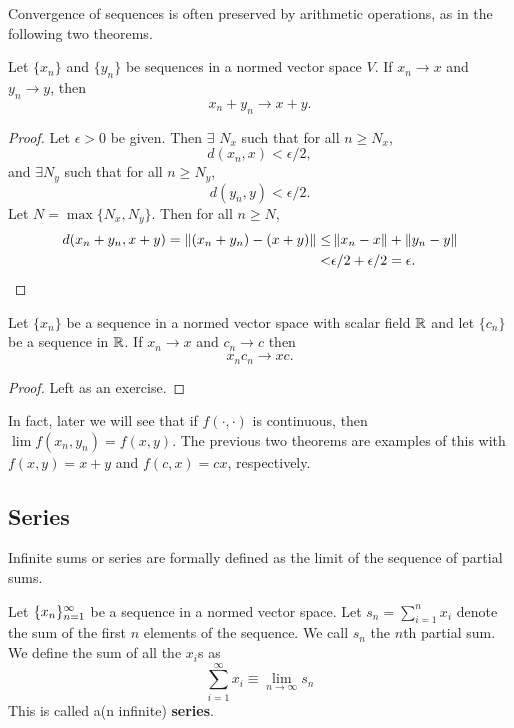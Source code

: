 Convergence of sequences is often preserved by arithmetic
operations, as in the following two theorems.
\begin{theorem}
  Let $\{x_n\}$ and $\{y_n\}$ be sequences in a normed vector space
  $V$. If $x_n \to x$ and $y_n \to y$, then
  \[ x_n + y_n \to x + y. \]
\end{theorem}
\begin{proof}
  Let $\epsilon > 0$ be given. Then $\exists$ $N_x$ such that for all
  $n \geq N_x$, 
  \[ d(x_n,x) < \epsilon/2,\] and $\exists N_y$ such that
  for all $n \geq N_y$,  
  \[ d(y_n,y) < \epsilon/2. \]
  Let $N =\max\{N_x,N_y\}$. Then for all $n \geq N$, 
  \begin{align*}
    d(x_n + y_n,x+y) = \left\Vert {(x_n + y_n) - (x+y)} \right\Vert \leq & \left\Vert {x_n -
      x} \right\Vert + \left\Vert {y_n - y} \right\Vert \\
    < & \epsilon/2 + \epsilon /2  = \epsilon.
  \end{align*}  
\end{proof}
\begin{theorem}
  Let $\{x_n \}$ be a sequence in a normed vector space with scalar
  field $\mathbb{R}$ and let $\{c_n\}$ be a sequence in $\mathbb{R}$. If
  $x_n \to x$ and $c_n \to c$ then 
  \[ x_n c_n \to x c. \]
\end{theorem}
\begin{proof}
  Left as an exercise.
\end{proof}
In fact, later we will see that if $f(\cdot,\cdot)$ is
continuous, then $\lim f(x_n, y_n) = f(x,y)$. The previous two
theorems are examples of this with $f(x,y) = x+y$ and $f(c,x) = c x$,
respectively.

\subsection{Series}

Infinite sums or series are formally defined as the limit of the
sequence of partial sums. 
\begin{definition}
  Let $\{{x}_n \}_{n=1}^\infty$ be a sequence in a normed vector space. Let $s_n =
  \sum_{i=1}^n x_i$ denote the sum of the first $n$ elements of the
  sequence. We call $s_n$ the $n$th partial sum. We define the sum of
  all the $x_i$s as
  \[ \sum_{i=1}^\infty x_i \equiv \lim_{n \to \infty} s_n \]
  This is called a(n infinite) \textbf{series}. 
\end{definition}


